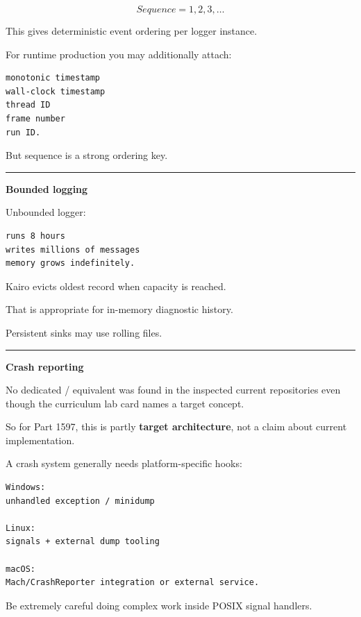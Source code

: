 \[
Sequence=1,2,3,\dots
\]

This gives deterministic event ordering per logger instance.

For runtime production you may additionally attach:

\begin{verbatim}
monotonic timestamp
wall-clock timestamp
thread ID
frame number
run ID.
\end{verbatim}

But sequence is a strong ordering key.

\begin{center}\rule{0.5\linewidth}{0.5pt}\end{center}

\textbf{Bounded logging}

Unbounded logger:

\begin{verbatim}
runs 8 hours
writes millions of messages
memory grows indefinitely.
\end{verbatim}

Kairo evicts oldest record when capacity is reached.

That is appropriate for in-memory diagnostic history.

Persistent sinks may use rolling files.

\begin{center}\rule{0.5\linewidth}{0.5pt}\end{center}

\textbf{Crash reporting}

No dedicated / equivalent was found in the inspected current repositories even though the curriculum lab card names a  target concept.

So for Part 1597, this is partly \textbf{target architecture}, not a claim about current implementation.

A crash system generally needs platform-specific hooks:

\begin{verbatim}
Windows:
unhandled exception / minidump

Linux:
signals + external dump tooling

macOS:
Mach/CrashReporter integration or external service.
\end{verbatim}

Be extremely careful doing complex work inside POSIX signal handlers.

